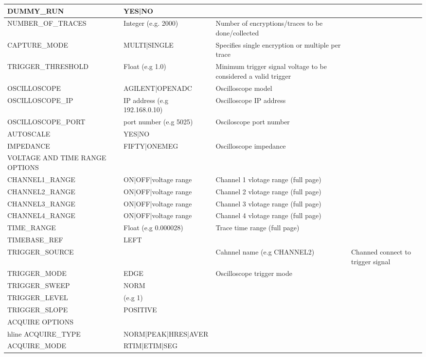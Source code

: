 \begin{table}[ht]
\begin{center}
\begin{tabular}{|p{4cm}|p{2cm}|p{7cm}|}
DUMMY\_RUN & YES|NO & \\ \hline
NUMBER\_OF\_TRACES & Integer (e.g. 2000) & Number of encryptions/traces to be done/collected \\ \hline
CAPTURE\_MODE & MULTI|SINGLE & Specifies single encryption or multiple per trace\\ \hline
TRIGGER\_THRESHOLD & Float (e.g 1.0)  & Minimum trigger signal voltage to be considered a valid trigger \\  \hline
OSCILLOSCOPE & AGILENT|OPENADC & Oscilloscope model \\ \hline
OSCILLOSCOPE\_IP & IP address (e.g 192.168.0.10) & Oscilloscope IP address \\ \hline
OSCILLOSCOPE\_PORT & port number (e.g 5025) & Osciloscope port number \\ \hline
AUTOSCALE & YES|NO &  \\ \hline    
IMPEDANCE & FIFTY|ONEMEG & Oscilloscope impedance \\ \hline
VOLTAGE AND TIME RANGE OPTIONS & & \\ \hline       
CHANNEL1\_RANGE & ON|OFF|voltage range & Channel 1 vlotage range (full page) \\ \hline
CHANNEL2\_RANGE & ON|OFF|voltage range & Channel 2 vlotage range (full page) \\ \hline
CHANNEL3\_RANGE & ON|OFF|voltage range & Channel 3 vlotage range (full page) \\ \hline
CHANNEL4\_RANGE & ON|OFF|voltage range & Channel 4 vlotage range (full page) \\ \hline
TIME\_RANGE & Float (e.g 0.000028) & Trace time range (full page) \\ \hline
TIMEBASE\_REF & LEFT & \\ \hline    
TRIGGER\_SOURCE & & Cahnnel name (e.g CHANNEL2) &  Channed connect to trigger signal\\ \hline
TRIGGER\_MODE &  EDGE & Oscilloscope trigger mode \\ \hline   
TRIGGER\_SWEEP & NORM & \\ \hline
TRIGGER\_LEVEL & (e.g 1) & \\ \hline
TRIGGER\_SLOPE & POSITIVE & \\ \hline
ACQUIRE OPTIONS & & \\hline
ACQUIRE\_TYPE & NORM|PEAK|HRES|AVER & \\ \hline
ACQUIRE\_MODE & RTIM|ETIM|SEG & \\ \hline
\end{tabular}
\end{center}
\end{table}

